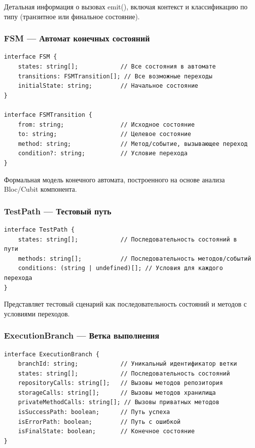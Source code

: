 \documentclass[14pt, russian]{scrartcl}
\begin{document}
Детальная информация о вызовах emit(), включая контекст и классификацию по типу (транзитное или финальное состояние).

\subsubsection{FSM — Автомат конечных состояний}

\begin{verbatim}
interface FSM {
    states: string[];            // Все состояния в автомате
    transitions: FSMTransition[]; // Все возможные переходы
    initialState: string;        // Начальное состояние
}

interface FSMTransition {
    from: string;                // Исходное состояние
    to: string;                  // Целевое состояние
    method: string;              // Метод/событие, вызывающее переход
    condition?: string;          // Условие перехода
}
\end{verbatim}

Формальная модель конечного автомата, построенного на основе анализа Bloc/Cubit компонента.

\subsubsection{TestPath — Тестовый путь}

\begin{verbatim}
interface TestPath {
    states: string[];            // Последовательность состояний в пути
    methods: string[];           // Последовательность методов/событий
    conditions: (string | undefined)[]; // Условия для каждого перехода
}
\end{verbatim}

Представляет тестовый сценарий как последовательность состояний и методов с условиями переходов.

\subsubsection{ExecutionBranch — Ветка выполнения}

\begin{verbatim}
interface ExecutionBranch {
    branchId: string;            // Уникальный идентификатор ветки
    states: string[];            // Последовательность состояний
    repositoryCalls: string[];   // Вызовы методов репозитория
    storageCalls: string[];      // Вызовы методов хранилища
    privateMethodCalls: string[]; // Вызовы приватных методов
    isSuccessPath: boolean;      // Путь успеха
    isErrorPath: boolean;        // Путь с ошибкой
    isFinalState: boolean;       // Конечное состояние
}
\end{verbatim}
\end{document}
